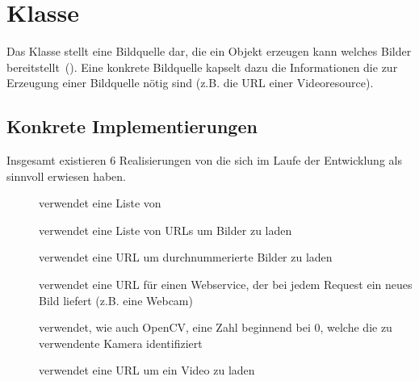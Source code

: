 \section{Klasse }
Das Klasse  stellt eine Bildquelle dar, die ein Objekt erzeugen kann welches Bilder bereitstellt~().
Eine konkrete Bildquelle kapselt dazu die Informationen die zur Erzeugung einer Bildquelle nötig sind (z.B. die URL einer Videoresource).


\subsection*{Konkrete Implementierungen}
Insgesamt existieren 6 Realisierungen von  die sich im Laufe der Entwicklung als sinnvoll erwiesen haben.

{
\setlength{\leftmargini}{1.5em}
\setlength{\labelsep}{\textwidth}
\begin{description}
  \item[]
    verwendet eine Liste von 
  \item[]
    verwendet eine Liste von URLs um Bilder zu laden
  \item[]
    verwendet eine URL um durchnummerierte Bilder zu laden
  \item[]
    verwendet eine URL für einen Webservice, der bei jedem Request ein neues Bild liefert (z.B. eine Webcam)
  \item[]
    verwendet, wie auch OpenCV, eine Zahl beginnend bei 0, welche die zu verwendente Kamera identifiziert
  \item[]
    verwendet eine URL um ein Video zu laden
\end{description}
}


